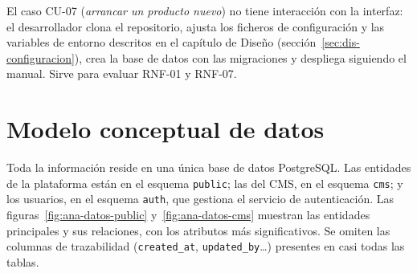 El caso CU-07 (\emph{arrancar un producto nuevo}) no tiene interacción con la
interfaz: el desarrollador clona el repositorio, ajusta los ficheros de
configuración y las variables de entorno descritos en el capítulo de Diseño
(sección~\ref{sec:dis-configuracion}), crea la base de datos con las
migraciones y despliega siguiendo el manual. Sirve para evaluar RNF-01 y
RNF-07.

\section{Modelo conceptual de datos}
\label{sec:ana-modelo-datos}

Toda la información reside en una única base de datos PostgreSQL. Las
entidades de la plataforma están en el esquema \texttt{public}; las del CMS, en
el esquema \texttt{cms}; y los usuarios, en el esquema \texttt{auth}, que
gestiona el servicio de autenticación. Las figuras~\ref{fig:ana-datos-public}
y~\ref{fig:ana-datos-cms} muestran las entidades principales y sus
relaciones, con los atributos más significativos. Se omiten las columnas de
trazabilidad (\texttt{created\_at}, \texttt{updated\_by}\ldots) presentes en
casi todas las tablas.

